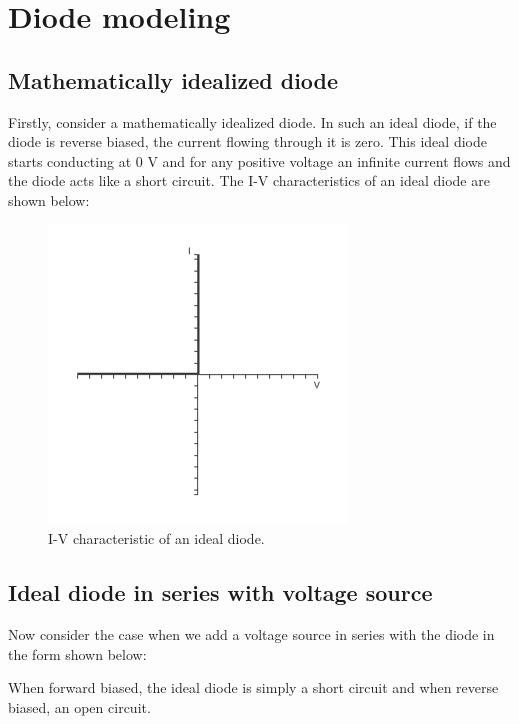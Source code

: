 \section{Diode modeling}

\subsection{Mathematically idealized diode}

Firstly, consider a mathematically idealized diode. In such an ideal diode, if the diode is reverse biased, the current flowing through it is zero. This ideal diode starts conducting at 0 V and for any positive voltage an infinite current flows and the diode acts like a short circuit. The I-V characteristics of an ideal diode are shown below:

\begin{figure}[H]
  \centering
  \includegraphics[width=0.4\linewidth]{figures/Diode_Modelling_Image5.png}
  \caption{I-V characteristic of an ideal diode.}
\end{figure}

\subsection{Ideal diode in series with voltage source}

Now consider the case when we add a voltage source in series with the diode in the form shown below:

When forward biased, the ideal diode is simply a short circuit and when reverse biased, an open circuit.


